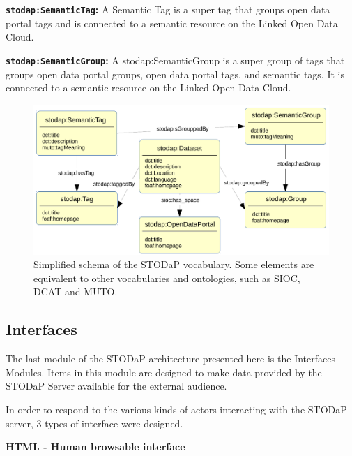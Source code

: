 \noindent \textbf{\texttt{stodap:SemanticTag}:} A Semantic Tag is a super tag that groups open data portal tags and is connected to a semantic resource on the Linked Open Data Cloud.

\noindent \textbf{\texttt{stodap:SemanticGroup}:} A stodap:SemanticGroup is a super group of tags that groups open data portal groups, open data portal tags, and semantic tags. It is connected to a semantic resource on the Linked Open Data Cloud.

\begin{figure}[t]
\begin{center}
\includegraphics[width=\columnwidth]{images/stodap_vocabulary.pdf}
\caption[Simplified schema of the STODaP vocabulary.]{Simplified schema of the STODaP vocabulary. Some elements are equivalent to other vocabularies and ontologies, such as SIOC, DCAT and MUTO.}
\label{fig:vocabulary}
\end{center}
\end{figure}

\subsection{Interfaces}
\label{sec:interfaces}

The last module of the STODaP architecture presented here is the Interfaces Modules.
Items in this module are designed to make data provided by the STODaP Server available for the external audience.

In order to respond to the various kinds of actors interacting with the STODaP server, 3 types of interface were designed.

\noindent\textbf{HTML - Human browsable interface}

